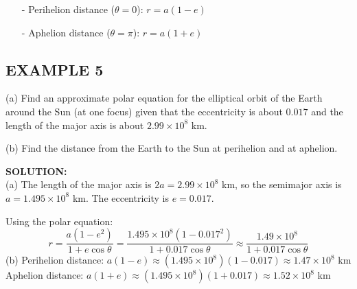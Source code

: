 \documentclass{article}
\begin{document}
\begin{tcolorbox}[
    colback=white!,   %
    colframe=orange!80!white, %
    title=,   %
    boxrule=0.5mm,      %
    arc=3mm          %
    ]
    \begin{itemize}
        \item[-] Perihelion distance ($\theta = 0$): $r = a(1 - e)$
        \item[-] Aphelion distance ($\theta = \pi$): $r = a(1 + e)$
    \end{itemize}
\end{tcolorbox}


\subsection*{EXAMPLE 5}
(a) Find an approximate polar equation for the elliptical orbit of the Earth around the Sun (at one focus) given that the eccentricity is about $0.017$ and the length of the major axis is about $2.99 \times 10^8$ km.

(b) Find the distance from the Earth to the Sun at perihelion and at aphelion.

\textbf{SOLUTION:}\\
(a) The length of the major axis is $2a = 2.99 \times 10^8$ km, so the semimajor axis is $a = 1.495 \times 10^8$ km. The eccentricity is $e = 0.017$.

Using the polar equation:
\[
r = \frac{a(1 - e^2)}{1 + e \cos\theta} = \frac{1.495 \times 10^8 (1 - 0.017^2)}{1 + 0.017 \cos\theta} \approx \frac{1.49 \times 10^8}{1 + 0.017 \cos\theta}
\]
(b) Perihelion distance: $a(1 - e) \approx (1.495 \times 10^8)(1 - 0.017) \approx 1.47 \times 10^8$ km \\
 Aphelion distance: $a(1 + e) \approx (1.495 \times 10^8)(1 + 0.017) \approx 1.52 \times 10^8$ km
\end{document}
